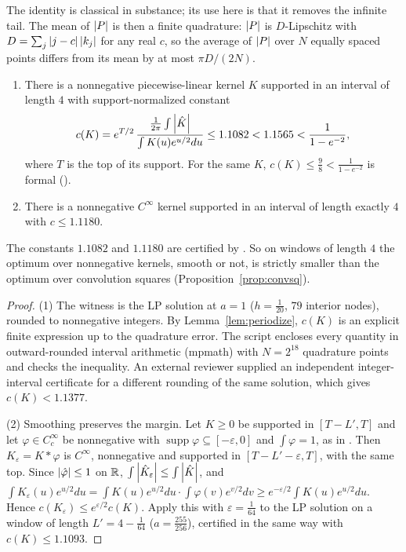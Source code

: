The identity is classical in substance; its use here is that it removes the infinite tail. The mean of $\left\lvert P \right\rvert$ is then a finite
quadrature: $\left\lvert P \right\rvert$ is $D$-Lipschitz with $D=\sum_j\left\lvert j-c \right\rvert\left\lvert k_j \right\rvert$ for any real $c$, so the average of $\left\lvert P \right\rvert$ over $N$ equally
spaced points differs from its mean by at most $\pi D/(2N)$.

\begin{proposition}\label{prop:separation}
\leavevmode
\begin{enumerate}
\item There is a nonnegative piecewise-linear kernel $K$ supported in an interval of length $4$ with support-normalized constant
\[
  c(K)=e^{T/2}\,\frac{\frac1{2\pi}\int\left\lvert \hat K \right\rvert}{\int K(u)e^{u/2}du}\le1.1082<1.1565<\frac1{1-e^{-2}},
\]
where $T$ is the top of its support. For the same $K$, $c(K)\le\frac98<\frac1{1-e^{-2}}$ is formal
().
\item There is a nonnegative $C^\infty$ kernel supported in an interval of length exactly $4$ with $c\le1.1180$.
\end{enumerate}
The constants $1.1082$ and $1.1180$ are certified by . So on windows of length $4$ the optimum over nonnegative kernels, smooth or not, is strictly smaller than the optimum over
convolution squares (Proposition~\ref{prop:convsq}).
\end{proposition}
\begin{proof}
(1) The witness is the LP solution at $a=1$ ($h=\frac1{20}$, $79$ interior nodes), rounded to nonnegative integers. By
Lemma~\ref{lem:periodize}, $c(K)$ is an explicit finite expression up to the quadrature error. The script encloses every quantity in
outward-rounded interval arithmetic (mpmath) with $N=2^{18}$ quadrature points and checks the inequality. An external reviewer
supplied an independent integer-interval certificate for a different rounding of the same solution, which gives $c(K)<1.1377$.

(2) Smoothing preserves the margin. Let $K\ge0$ be supported in $[T-L',T]$ and let $\varphi\in C^\infty_c$ be nonnegative with
$\operatorname{supp}\varphi\subseteq[-\varepsilon,0]$ and $\int\varphi=1$, as in \cite[\S2.2]{cmqr2024}. Then $K_\varepsilon=K*\varphi$ is $C^\infty$, nonnegative and
supported in $[T-L'-\varepsilon,T]$, with the same top. Since $\left\lvert \hat\varphi \right\rvert\le1$ on $\mathbb{R}$, $\int\left\lvert \hat K_\varepsilon \right\rvert\le\int\left\lvert \hat K \right\rvert$, and
$\int K_\varepsilon(u)e^{u/2}du=\int K(u)e^{u/2}du\cdot\int\varphi(v)e^{v/2}dv\ge e^{-\varepsilon/2}\int K(u)e^{u/2}du$. Hence $c(K_\varepsilon)\le e^{\varepsilon/2}c(K)$.
Apply this with $\varepsilon=\frac1{64}$ to the LP solution on a window of length $L'=4-\frac1{64}$ ($a=\frac{255}{256}$), certified in the same
way with $c(K)\le1.1093$.
\end{proof}

